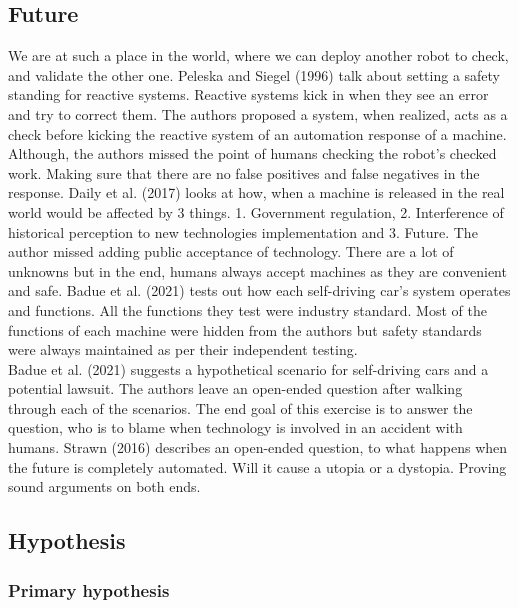 \documentclass[
  man]{apa7}
\begin{document}
\hypertarget{future}{%
\subsection{Future}\label{future}}

We are at such a place in the world, where we can deploy another robot to check, and validate the other one. Peleska and Siegel (1996) talk about setting a safety standing for reactive systems. Reactive systems kick in when they see an error and try to correct them. The authors proposed a system, when realized, acts as a check before kicking the reactive system of an automation response of a machine. Although, the authors missed the point of humans checking the robot's checked work. Making sure that there are no false positives and false negatives in the response. Daily et al. (2017) looks at how, when a machine is released in the real world would be affected by 3 things. 1. Government regulation, 2. Interference of historical perception to new technologies implementation and 3. Future. The author missed adding public acceptance of technology. There are a lot of unknowns but in the end, humans always accept machines as they are convenient and safe. Badue et al. (2021) tests out how each self-driving car's system operates and functions. All the functions they test were industry standard. Most of the functions of each machine were hidden from the authors but safety standards were always maintained as per their independent testing.\\
Badue et al. (2021) suggests a hypothetical scenario for self-driving cars and a potential lawsuit. The authors leave an open-ended question after walking through each of the scenarios. The end goal of this exercise is to answer the question, who is to blame when technology is involved in an accident with humans. Strawn (2016) describes an open-ended question, to what happens when the future is completely automated. Will it cause a utopia or a dystopia. Proving sound arguments on both ends.

\hypertarget{hypothesis}{%
\subsection{Hypothesis}\label{hypothesis}}

\hypertarget{primary-hypothesis}{%
\subsubsection{Primary hypothesis}\label{primary-hypothesis}}
\end{document}

